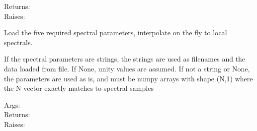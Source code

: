 \documentclass[a4paper,10pt,english]{sphinxmanual}
\begin{document}
\begin{fulllineitems}
\begin{fulllineitems}
\begin{description}
\item[{Returns:}] \leavevmode
{}

\item[{Raises:}] \leavevmode
{}

\end{description}

\end{fulllineitems}


\begin{fulllineitems}
\label{rylookup:pyradi.rylookup.RadLookup.LoadSpectrals}
Load the five required spectral parameters, interpolate on the
fly to local spectrals.

If the spectral parameters are strings, the strings are used as filenames
and the data loaded from file.  If None, unity values are assumed. If not
a string or None, the parameters are used as is, and must be numpy arrays
with shape (N,1) where the N vector exactly matches to spectral samples
\begin{description}
\item[{Args:}] \leavevmode
{}

\item[{Returns:}] \leavevmode
{}

\item[{Raises:}] \leavevmode
{}

\end{description}


\end{fulllineitems}
\end{fulllineitems}
\end{document}
